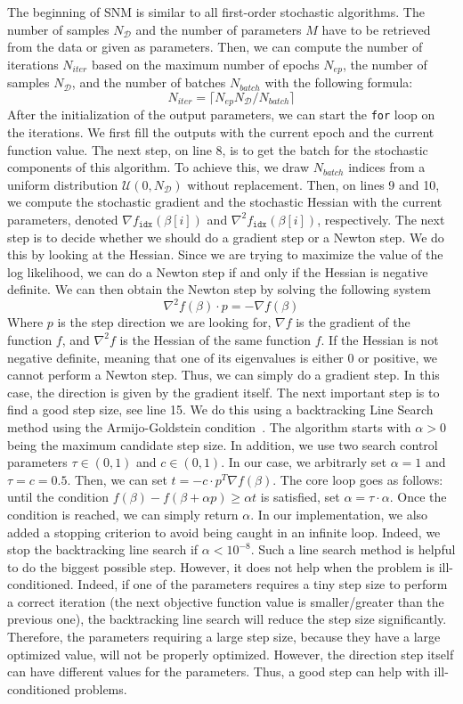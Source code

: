 \documentclass[conference]{IEEEtran}
\begin{document}
The beginning of SNM is similar to all first-order stochastic algorithms. The number of samples $N_{\mathcal{D}}$ and the number of parameters $M$ have to be retrieved from the data or given as parameters. Then, we can compute the number of iterations $N_{iter}$ based on the maximum number of epochs $N_{ep}$, the number of samples $N_{\mathcal{D}}$, and the number of batches $N_{batch}$ with the following formula:
\[
N_{iter} = \lceil N_{ep}N_{\mathcal{D}}/N_{batch} \rceil
\]
After the initialization of the output parameters, we can start the \texttt{for} loop on the iterations. We first fill the outputs with the current epoch and the current function value. The next step, on line 8, is to get the batch for the stochastic components of this algorithm. To achieve this, we draw $N_{batch}$ indices from a uniform distribution $\mathcal{U}(0, N_{\mathcal{D}})$ without replacement. Then, on lines 9 and 10, we compute the stochastic gradient and the stochastic Hessian with the current parameters, denoted $\nabla f_{\texttt{idx}}(\beta[i])$ and $\nabla^2 f_{\texttt{idx}}(\beta[i])$, respectively. The next step is to decide whether we should do a gradient step or a Newton step. We do this by looking at the Hessian. Since we are trying to maximize the value of the log likelihood, we can do a Newton step if and only if the Hessian is negative definite. We can then obtain the Newton step by solving the following system
\[
\nabla^2 f(\beta) \cdot p = - \nabla f(\beta)
\]
Where $p$ is the step direction we are looking for, $\nabla f$ is the gradient of the function $f$, and $\nabla^2 f$ is the Hessian of the same function $f$. If the Hessian is not negative definite, meaning that one of its eigenvalues is either 0 or positive, we cannot perform a Newton step. Thus, we can simply do a gradient step. In this case, the direction is given by the gradient itself. The next important step is to find a good step size, see line 15. We do this using a backtracking Line Search method using the Armijo-Goldstein condition~\cite{armijo_minimization_1966}. The algorithm starts with $\alpha>0$ being the maximum candidate step size. In addition, we use two search control parameters $\tau\in(0,1)$ and $c\in(0,1)$. In our case, we arbitrarly set $\alpha=1$ and $\tau=c=0.5$. Then, we can set $t = -c\cdot p^T\nabla f(\beta)$. The core loop goes as follows: until the condition $f(\beta) - f(\beta + \alpha p) \geq \alpha t$ is satisfied, set $\alpha = \tau \cdot \alpha$. Once the condition is reached, we can simply return $\alpha$. In our implementation, we also added a stopping criterion to avoid being caught in an infinite loop. Indeed, we stop the backtracking line search if $\alpha < 10^{-8}$. Such a line search method is helpful to do the biggest possible step. However, it does not help when the problem is ill-conditioned. Indeed, if one of the parameters requires a tiny step size to perform a correct iteration (the next objective function value is smaller/greater than the previous one), the backtracking line search will reduce the step size significantly. Therefore, the parameters requiring a large step size, because they have a large optimized value, will not be properly optimized. However, the direction step itself can have different values for the parameters. Thus, a good step can help with ill-conditioned problems.
\end{document}
